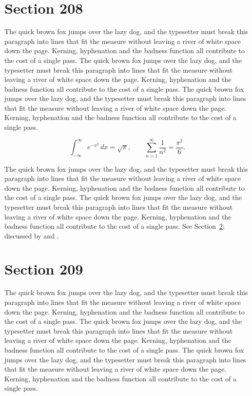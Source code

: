 \documentclass{article}
\begin{document}
\section{Section 208}
\label{sec:208}
The quick brown fox jumps over the lazy dog, and the typesetter must break this paragraph into lines that fit the measure without leaving a river of white space down the page. Kerning, hyphenation and the badness function all contribute to the cost of a single pass. The quick brown fox jumps over the lazy dog, and the typesetter must break this paragraph into lines that fit the measure without leaving a river of white space down the page. Kerning, hyphenation and the badness function all contribute to the cost of a single pass. The quick brown fox jumps over the lazy dog, and the typesetter must break this paragraph into lines that fit the measure without leaving a river of white space down the page. Kerning, hyphenation and the badness function all contribute to the cost of a single pass. 

\begin{equation}\label{eq:208}
\int_{-\infty}^{\infty} e^{-x^{2}}\,dx = \sqrt{\pi}, \qquad
\sum_{n=1}^{\infty} \frac{1}{n^{2}} = \frac{\pi^{2}}{6}.
\end{equation}

The quick brown fox jumps over the lazy dog, and the typesetter must break this paragraph into lines that fit the measure without leaving a river of white space down the page. Kerning, hyphenation and the badness function all contribute to the cost of a single pass. The quick brown fox jumps over the lazy dog, and the typesetter must break this paragraph into lines that fit the measure without leaving a river of white space down the page. Kerning, hyphenation and the badness function all contribute to the cost of a single pass. 
See Section~\ref{sec:209}; discussed by \textcite{k4} and \textcite{l1}.
\section{Section 209}
\label{sec:209}
The quick brown fox jumps over the lazy dog, and the typesetter must break this paragraph into lines that fit the measure without leaving a river of white space down the page. Kerning, hyphenation and the badness function all contribute to the cost of a single pass. The quick brown fox jumps over the lazy dog, and the typesetter must break this paragraph into lines that fit the measure without leaving a river of white space down the page. Kerning, hyphenation and the badness function all contribute to the cost of a single pass. The quick brown fox jumps over the lazy dog, and the typesetter must break this paragraph into lines that fit the measure without leaving a river of white space down the page. Kerning, hyphenation and the badness function all contribute to the cost of a single pass. 
\end{document}
